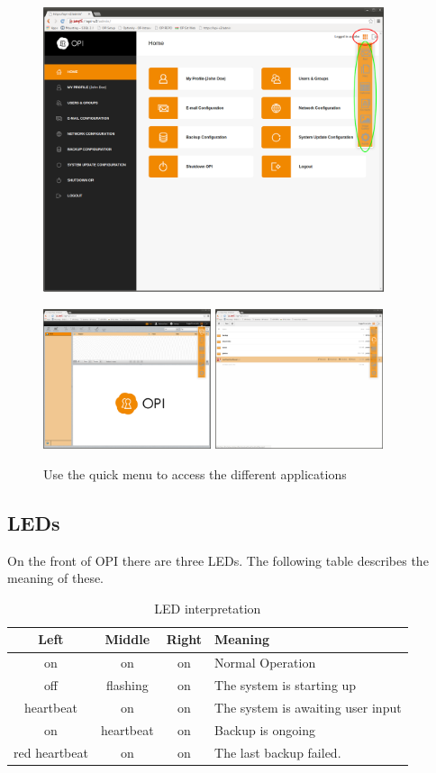\documentclass[12pt,a4paper,titlepage]{article}
\begin{document}
\begin{figure}[h]
\centering
\includegraphics[width=10cm]{./img/menu-admin}

\includegraphics[width=4.93cm]{./img/menu-mail}
\includegraphics[width=4.93cm]{./img/menu-files}
\caption{Use the quick menu to access the different applications}
\end{figure}

\newpage
\subsection{LEDs}
On the front of OPI there are three LEDs.
The following table describes the meaning of these.
\begin{table}[h]
\centering
\renewcommand{\arraystretch}{1.5}
\renewcommand{\tabcolsep}{0.2cm}
\begin{tabular}{|c|c|c|l|}
\hline
\textbf{Left}&\textbf{Middle}&\textbf{Right}&\textbf{Meaning} \\
\hline
on & on & on & Normal Operation \\
\hline
off & flashing & on & The system is starting up \\
\hline
heartbeat & on & on & The system is awaiting user input\\
\hline
on & heartbeat & on & Backup is ongoing \\
\hline
red heartbeat & on & on & The last backup failed. \\
\hline
\end{tabular}
\caption{LED interpretation}
\end{table}
\end{document}
